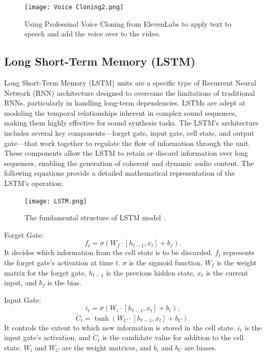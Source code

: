 \documentclass[11pt,a4paper,oneside]{report}
\begin{document}
\begin{figure}[htbp]
  \centering
  \texttt{[image: Voice Cloning2.png]}
  \caption{Using Professinal Voice Cloning from ElevenLabs to apply text to speech and add the voice over to the video.}
\end{figure}

\subsection{Long Short-Term Memory (LSTM)}

Long Short-Term Memory (LSTM) units are a specific type of Recurrent Neural Network (RNN) architecture designed to overcome the limitations of traditional RNNs, particularly in handling long-term dependencies. LSTMs are adept at modeling the temporal relationships inherent in complex sound sequences, making them highly effective for sound synthesis tasks. The LSTM's architecture includes several key components—forget gate, input gate, cell state, and output gate—that work together to regulate the flow of information through the unit. These components allow the LSTM to retain or discard information over long sequences, enabling the generation of coherent and dynamic audio content. The following equations provide a detailed mathematical representation of the LSTM's operation:

\begin{figure}[htbp]
  \centering
  \texttt{[image: LSTM.png]}
  \caption{The fundamental structure of LSTM model \cite{wikidocs2023deeplearning}.}
\end{figure}

Forget Gate:
\begin{equation}
f_t = \sigma(W_{f} \cdot [h_{t-1}, x_t] + b_f).
\end{equation}
It decides which information from the cell state is to be discarded. $f_t$ represents the forget gate's activation at time $t$. $\sigma$ is the sigmoid function, $W_{f}$ is the weight matrix for the forget gate, $h_{t-1}$ is the previous hidden state, $x_t$ is the current input, and $b_f$ is the bias.

Input Gate:
\begin{equation}
i_t = \sigma(W_{i} \cdot [h_{t-1}, x_t] + b_i),
\end{equation}
\begin{equation}
\tilde{C}_t = \tanh(W_{C} \cdot [h_{t-1}, x_t] + b_C).
\end{equation}
It controls the extent to which new information is stored in the cell state. $i_t$ is the input gate's activation, and $\tilde{C}_t$ is the candidate value for addition to the cell state. $W_{i}$ and $W_{C}$ are the weight matrices, and $b_i$ and $b_C$ are biases.
\end{document}
